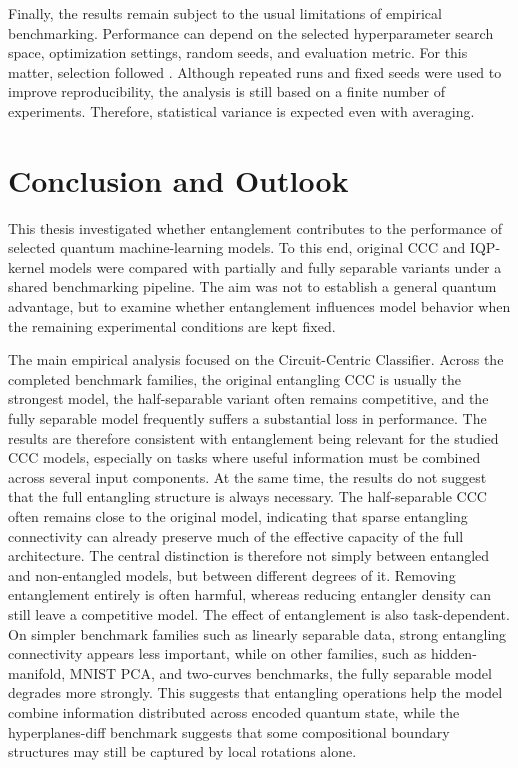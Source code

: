 \documentclass[12pt,a4paper,openany]{report}
\let\parencite\citep
\begin{document}
Finally, the results remain subject to the usual limitations of empirical benchmarking. Performance can depend on the selected hyperparameter search space, optimization settings, random seeds, and evaluation metric. For this matter, selection followed \parencite{bowles2024better}.  Although repeated runs and fixed seeds were used to improve reproducibility, the analysis is still based on a finite number of experiments. Therefore, statistical variance is expected even with averaging.

\chapter{Conclusion and Outlook}

This thesis investigated whether entanglement contributes to the performance of selected quantum machine-learning models. To this end, original CCC and IQP-kernel models were compared with partially and fully separable variants under a shared benchmarking pipeline. The aim was not to establish a general quantum advantage, but to examine whether entanglement influences model behavior when the remaining experimental conditions are kept fixed.

The main empirical analysis focused on the Circuit-Centric Classifier. Across the completed benchmark families, the original entangling CCC is usually the strongest model, the half-separable variant often remains competitive, and the fully separable model frequently suffers a substantial loss in performance. The results are therefore consistent with entanglement being relevant for the studied CCC models, especially on tasks where useful information must be combined across several input components. At the same time, the results do not suggest that the full entangling structure is always necessary. The half-separable CCC often remains close to the original model, indicating that sparse entangling connectivity can already preserve much of the effective capacity of the full architecture. The central distinction is therefore not simply between entangled and non-entangled models, but between different degrees of it. Removing entanglement entirely is often harmful, whereas reducing entangler density can still leave a competitive model. The effect of entanglement is also task-dependent. On simpler benchmark families such as linearly separable data, strong entangling connectivity appears less important, while on other families, such as hidden-manifold, MNIST PCA, and two-curves benchmarks, the fully separable model degrades more strongly. This suggests that entangling operations help the model combine information distributed across encoded quantum state, while the hyperplanes-diff benchmark suggests that some compositional boundary structures may still be captured by local rotations alone.
\end{document}
